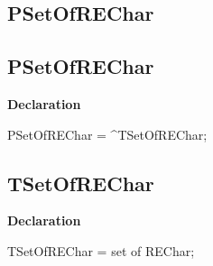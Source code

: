 \documentclass{report}
\newif\ifpdf
\begin{document}
\subsection*{\large{\textbf{PSetOfREChar}}\normalsize\hspace{1ex}\hrulefill}
\else
\subsection*{PSetOfREChar}
\fi
\label{RegExpr-PSetOfREChar}
\begin{list}{}{
\setlength{\itemindent}{0cm}
\setlength{\listparindent}{0cm}
\setlength{\leftmargin}{\evensidemargin}
\addtolength{\leftmargin}{\tmplength}
\settowidth{\labelsep}{X}
\addtolength{\leftmargin}{\labelsep}
\setlength{\labelwidth}{\tmplength}
}
\item[\textbf{Declaration}\hfill]
\ifpdf
\begin{flushleft}
\fi
\begin{ttfamily}
PSetOfREChar = {\^{}}TSetOfREChar;\end{ttfamily}

\ifpdf
\end{flushleft}
\fi

\end{list}
\ifpdf
\subsection*{\large{\textbf{TSetOfREChar}}\normalsize\hspace{1ex}\hrulefill}
\else
\subsection*{TSetOfREChar}
\fi
\label{RegExpr-TSetOfREChar}
\begin{list}{}{
\setlength{\itemindent}{0cm}
\setlength{\listparindent}{0cm}
\setlength{\leftmargin}{\evensidemargin}
\addtolength{\leftmargin}{\tmplength}
\settowidth{\labelsep}{X}
\addtolength{\leftmargin}{\labelsep}
\setlength{\labelwidth}{\tmplength}
}
\item[\textbf{Declaration}\hfill]
\ifpdf
\begin{flushleft}
\fi
\begin{ttfamily}
TSetOfREChar = set of REChar;\end{ttfamily}

\ifpdf
\end{flushleft}
\fi

\end{list}
\ifpdf
\end{document}

